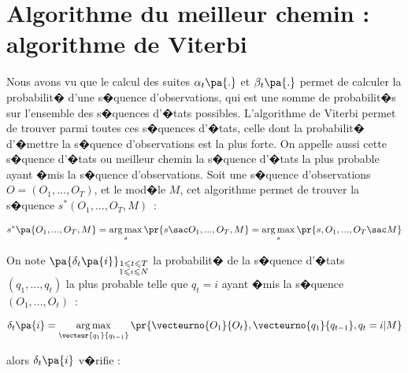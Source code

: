 \section{Algorithme du meilleur chemin : algorithme de Viterbi}
\label{paragraphe_viterbi_principe}


%
%

Nous avons vu que le calcul des suites $\alpha_{t}\pa{.}$ et $\beta _{t}\pa{.}$ permet de calculer la probabilit� d'une s�quence d'observations, qui est une somme de probabilit�s sur l'ensemble des s�quences d'�tats possibles. L'algorithme de Viterbi permet de trouver parmi toutes ces s�quences d'�tats, celle dont la probabilit� d'�mettre la s�quence d'observations est la plus forte. On appelle aussi cette s�quence d'�tats ou meilleur chemin la s�quence d'�tats la plus probable ayant �mis la s�quence d'observations. Soit une s�quence d'observations $O=\left(  O_{1},...,O_{T}\right)$, et le mod�le $M$, cet algorithme permet de trouver la s�quence $s^{\ast }\left(  O_{1},...,O_{T},M\right)$~:%

        \begin{eqnarray}
        s^* \pa{ O_{1},...,O_{T},M }    =\underset{s}{\arg\max} \, \pr{  s \sac O_{1},...,O_{T},M }
                                        =\underset{s}{\arg\max} \, \pr{ s,O_{1},...,O_{T} \sac M }
                                        \label{hmm_viterbi_eq_1}
        \end{eqnarray}

On note $\pa{ \delta_{t} \pa{i}} _{\substack{1\leqslant t\leqslant T\\1\leqslant i\leqslant N}}$ la probabilit� de la s�quence d'�tats $\left(  q_{1},...,q_{t}\right)  $ la plus probable telle que $q_{t}=i$ ayant �mis la s�quence $\left( O_{1},...,O_{t}\right)$~:

        \begin{eqnarray}
        \delta_t\pa{i} = \underset{\vecteur{q_1}{q_{t-1}}}{\arg \max} \, \pr{ \vecteurno{O_1}{O_t}, \vecteurno{q_1}{q_{t-1}},q_t=i | M}
        \label{hmm_viterbi_eq_2}
        \end{eqnarray}

alors $\delta_t\pa{i}$ v�rifie :

